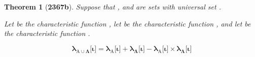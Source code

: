 \documentclass[preview]{standalone}
\newtheorem{theorem}{Theorem}
\begin{document}
\begin{theorem}[\textbf{2367b}]
    Suppose that , and \bm{$\Lambda$} are sets with universal set \bm{$\Omega$}.
    \begin{center}
        Let  be the characteristic function 
        ,
        let  be the characteristic function 
        ,
        and let \bm{$\lambda_{\Lambda}$} be the characteristic function 
        .
    \end{center}
    \begin{equation*}
        \bm{
            \lambda_{\mathrm{A} \cup \Lambda} \big[ \iota \big] 
                = 
            \lambda_{\mathrm{A}} \big[ \iota \big] 
                + 
            \lambda_{\Lambda} \big[ \iota \big] 
                - 
            \lambda_{\mathrm{A}} \big[ \iota \big]
                \times 
            \lambda_{\Lambda} \big[ \iota \big]
        }
    \end{equation*}
\end{theorem}
\end{document}
